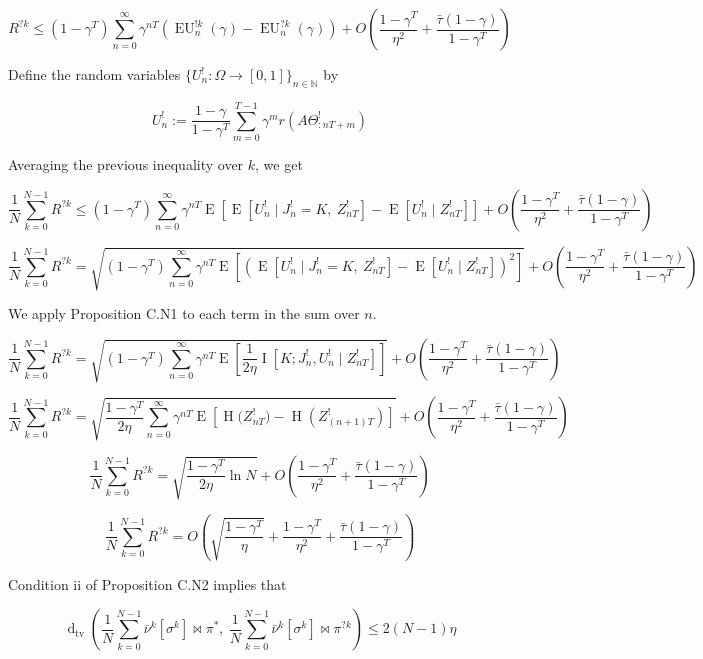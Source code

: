 \documentclass[a4paper]{article}
\newcommand{\E}[1]{\underset{#1}{\operatorname{E}}}
\newcommand{\I}[1]{\underset{#1}{\operatorname{I}}}
\newcommand{\En}{\operatorname{H}}
\newcommand{\Dtv}{\operatorname{d}_{\text{tv}}}
\newcommand{\Nats}{\mathbb{N}}
\newcommand{\Sq}[2]{\{#1\}_{#2 \in \Nats}}
\newcommand{\Sqn}[1]{\Sq{#1}{n}}
\newcommand{\EU}{\operatorname{EU}}
\newcommand{\J}{J}
\begin{document}
$$R^{?k} \leq (1-\gamma^T)\sum_{n=0}^\infty \gamma^{nT} \left(\EU^{!k}_n(\gamma)-\EU^{?k}_n(\gamma)\right) + O\left(\frac{1-\gamma^T}{\eta^2}+\frac{\bar{\tau}(1-\gamma)}{1-\gamma^T}\right)$$

Define the random variables $\Sqn{U^!_n : \Omega \rightarrow [0,1]}$ by 

$$U^!_n:=\frac{1-\gamma}{1-\gamma^T}\sum_{m=0}^{T-1} \gamma^{m} r\left(A\Theta^!_{:nT+m}\right)$$

Averaging the previous inequality over $k$, we get

$$\frac{1}{N}\sum_{k=0}^{N-1}R^{?k} \leq (1-\gamma^T)\sum_{n=0}^\infty \gamma^{nT} \E{}\left[\E{}\left[U^!_n \mid \J^!_n = K,\ Z^!_{nT}\right]-\E{}\left[U^!_n \mid Z^!_{nT}\right]\right] + O\left(\frac{1-\gamma^T}{\eta^2}+\frac{\bar{\tau}(1-\gamma)}{1-\gamma^T}\right)$$


$$\frac{1}{N}\sum_{k=0}^{N-1}R^{?k} = \sqrt{(1-\gamma^T)\sum_{n=0}^\infty \gamma^{nT} \E{}\left[\left(\E{}\left[U^!_n \mid \J^!_n = K,\ Z^!_{nT}\right]-\E{}\left[U^!_n \mid Z^!_{nT}\right]\right)^2\right]} + O\left(\frac{1-\gamma^T}{\eta^2}+\frac{\bar{\tau}(1-\gamma)}{1-\gamma^T}\right)$$

We apply Proposition C.N1 to each term in the sum over $n$.

$$\frac{1}{N}\sum_{k=0}^{N-1}R^{?k} = \sqrt{(1-\gamma^T)\sum_{n=0}^\infty \gamma^{nT} \E{}\left[\frac{1}{2\eta}\I{}\left[K;\J^!_n,U^!_n \mid Z^!_{nT}\right]\right]} + O\left(\frac{1-\gamma^T}{\eta^2}+\frac{\bar{\tau}(1-\gamma)}{1-\gamma^T}\right)$$

$$\frac{1}{N}\sum_{k=0}^{N-1}R^{?k} = \sqrt{\frac{1-\gamma^T}{2\eta}\sum_{n=0}^\infty \gamma^{nT} \E{}\left[\En\Big(Z^!_{nT}\Big)-\En\left(Z^!_{(n+1)T}\right)\right]} + O\left(\frac{1-\gamma^T}{\eta^2}+\frac{\bar{\tau}(1-\gamma)}{1-\gamma^T}\right)$$

$$\frac{1}{N}\sum_{k=0}^{N-1}R^{?k} = \sqrt{\frac{1-\gamma^T}{2\eta}\ln N} + O\left(\frac{1-\gamma^T}{\eta^2}+\frac{\bar{\tau}(1-\gamma)}{1-\gamma^T}\right)$$

$$\frac{1}{N}\sum_{k=0}^{N-1}R^{?k} = O\left(\sqrt{\frac{1-\gamma^T}{\eta}} +\frac{1-\gamma^T}{\eta^2}+\frac{\bar{\tau}(1-\gamma)}{1-\gamma^T}\right)$$

Condition ii of Proposition C.N2 implies that

$$\Dtv\left(\frac{1}{N}\sum_{k=0}^{N-1}{\bar{\nu}^k\left[\sigma^k\right]\bowtie\pi^*},\ \frac{1}{N}\sum_{k=0}^{N-1}{\bar{\nu}^k\left[\sigma^k\right]\bowtie\pi^{?k}}\right) \leq 2(N-1)\eta$$
\end{document}
